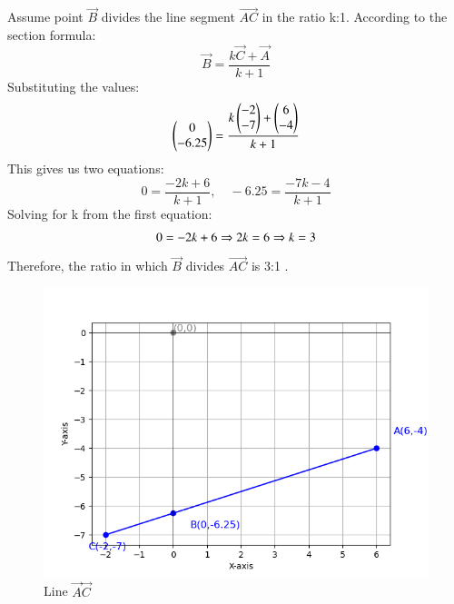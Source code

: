 \documentclass[journal]{IEEEtran}
\numberwithin{equation}{enumi}
\numberwithin{figure}{enumi}
\begin{document}
Assume point $\vec{B}$ divides the line segment $\vec{AC}$ in the ratio  k:1.  According to the section formula:
\begin{equation}
\vec{B} = \frac{k\vec{C}+\vec{A}}{k+1}
\end{equation}
Substituting the values:
\begin{equation}
\begin{pmatrix}0 \\ -6.25\end{pmatrix}  = \frac{k \begin{pmatrix}-2 \\ -7\end{pmatrix} +  \begin{pmatrix}6 \\ -4\end{pmatrix} }{k+1}
\end{equation}
This gives us two equations:
\begin{equation}
0 = \frac{-2k + 6}{k+1}, \quad -6.25 = \frac{-7k - 4}{k+1}
\end{equation}
Solving for k from the first equation:
\begin{equation}
0 = -2k + 6 \\
\Rightarrow  2k = 6 \\
\Rightarrow k = 3 \\
\end{equation}
Therefore, the ratio in which  $\vec{B}$  divides $\vec{AC}$ is  3:1 .
\begin{figure}[h!]
	\centering
	\includegraphics[width=0.5\linewidth]{figs/Figure_1.png}
	\caption{ Line $\vec{A}\vec{C}$}
	\label{stemplot}
\end{figure}	
\end{document}
